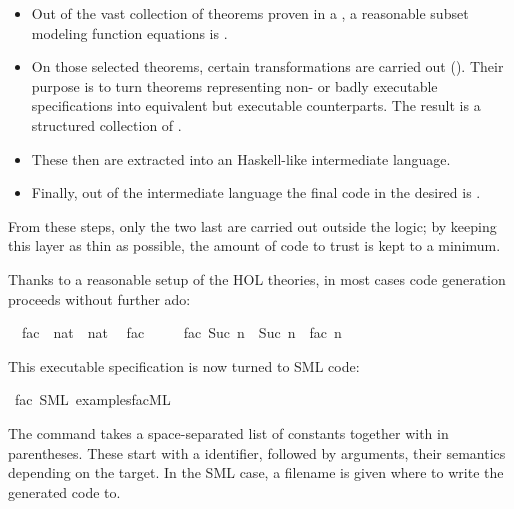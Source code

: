 \begin{isabellebody}
\begin{isamarkuptext}
  \begin{itemize}

    \item Out of the vast collection of theorems proven in a
      , a reasonable subset modeling
      function equations is .

    \item On those selected theorems, certain
      transformations are carried out
      ().  Their purpose is to turn theorems
      representing non- or badly executable
      specifications into equivalent but executable counterparts.
      The result is a structured collection of .

    \item These  then are extracted
      into an Haskell-like intermediate
      language.

    \item Finally, out of the intermediate language the final
      code in the desired  is .

  \end{itemize}

  From these steps, only the two last are carried out
  outside the logic; by keeping this layer as
  thin as possible, the amount of code to trust is
  kept to a minimum.%
\end{isamarkuptext}%
\isamarkuptrue%
%
\isamarkuptrue%
%
\isamarkuptrue%
%
\begin{isamarkuptext}%
Thanks to a reasonable setup of the HOL theories, in
  most cases code generation proceeds without further ado:%
\end{isamarkuptext}%
\isamarkuptrue%
\isamarkupfalse%
\isanewline
\ \ fac\ {\isacharcolon}{\isacharcolon}\ {\isachardoublequoteopen}nat\ {\isasymRightarrow}\ nat{\isachardoublequoteclose}\isanewline
\isanewline
{}\isamarkupfalse%
\isanewline
\ \ {\isachardoublequoteopen}fac\ {}\ {\isacharequal}\ {}{\isachardoublequoteclose}\isanewline
\ \ {\isachardoublequoteopen}fac\ {\isacharparenleft}Suc\ n{\isacharparenright}\ {\isacharequal}\ Suc\ n\ {\isacharasterisk}\ fac\ n{\isachardoublequoteclose}%
\begin{isamarkuptext}%
This executable specification is now turned to SML code:%
\end{isamarkuptext}%
\isamarkuptrue%
\isamarkupfalse%
\ fac\ {\isacharparenleft}SML\ {\isachardoublequoteopen}examples{\isacharslash}fac{\isachardot}ML{\isachardoublequoteclose}{\isacharparenright}%
\begin{isamarkuptext}%
The \isa{{\isasymCODEGEN}} command takes a space-separated list of
  constants together with 
  in parentheses. These start with a 
  identifier, followed by arguments, their semantics
  depending on the target. In the SML case, a filename
  is given where to write the generated code to.


\end{isamarkuptext}
\end{isabellebody}
